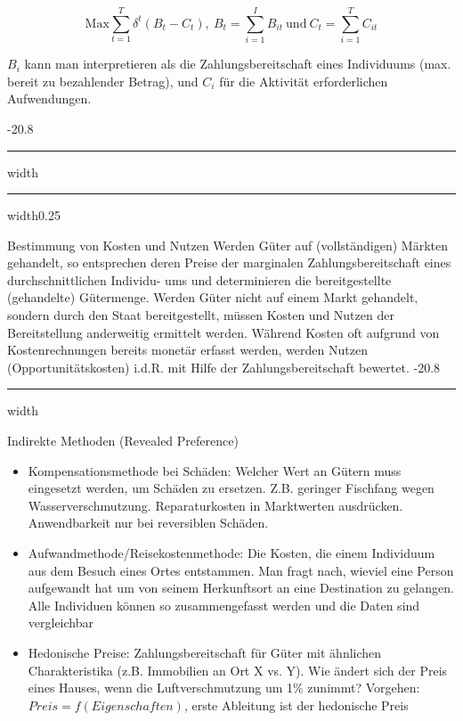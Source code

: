 \documentclass[9pt, landscape, fleqn]{scrartcl}
\makeatletter
\renewcommand{\subsection}{\@startsection{subsection}{1}{0mm}%
{-2\baselineskip}{0.8\baselineskip}%
{\hrule depth 0.2pt width\columnwidth\hrule depth0.75pt
width0.25\columnwidth\vspace*{1.2em}\large\bfseries\rmfamily}}
\renewcommand{\subsubsection}{\@startsection{subsubsection}{1}{0mm}%
{-2\baselineskip}{0.8\baselineskip}%
{\hrule depth 0.2pt width\columnwidth\vspace*{1.2em}\normalsize\bfseries\rmfamily}}
\makeatother
\begin{document}
\begin{multicols*}{3}
\begin{equation}
    \text{Max} \sum_{t=1}^T \delta^t(B_t - C_t),~ B_t = \sum_{i=1}^I B_{it}~\text{und}~ C_t = \sum_{i=1}^T C_{it}
\end{equation}

$B_i$ kann man interpretieren als die Zahlungsbereitschaft eines Individuums (max. bereit zu bezahlender Betrag), und $C_i$ für die Aktivität erforderlichen Aufwendungen.

\subsection{Bestimmung von Kosten und Nutzen}
Werden Güter auf (vollständigen) Märkten gehandelt, so entsprechen deren Preise der marginalen Zahlungsbereitschaft eines durchschnittlichen Individu- ums und determinieren die bereitgestellte (gehandelte) Gütermenge. Werden Güter nicht auf einem Markt gehandelt, sondern durch den Staat bereitgestellt, müssen Kosten und Nutzen der Bereitstellung anderweitig ermittelt werden. Während Kosten oft aufgrund von Kostenrechnungen bereits monetär erfasst werden, werden Nutzen (Opportunitätskosten) i.d.R. mit Hilfe der Zahlungsbereitschaft bewertet.
\subsubsection{Indirekte Methoden (Revealed Preference)}

\begin{itemize}
    \item Kompensationsmethode bei Schäden: Welcher Wert an Gütern muss eingesetzt werden, um Schäden zu ersetzen. Z.B. geringer Fischfang wegen Wasserverschmutzung. Reparaturkosten in Marktwerten ausdrücken. Anwendbarkeit nur bei reversiblen Schäden.
    \item Aufwandmethode/Reisekostenmethode: Die Kosten, die einem Individuum aus dem Besuch eines Ortes entstammen. Man fragt nach, wieviel eine Person aufgewandt hat um von seinem Herkunftsort an eine Destination zu gelangen. Alle Individuen können so zusammengefasst werden und die Daten sind vergleichbar 
    \item Hedonische Preise: Zahlungsbereitschaft für Güter mit ähnlichen Charakteristika (z.B. Immobilien an Ort X vs. Y). Wie ändert sich der Preis eines Hauses, wenn die Luftverschmutzung um 1\% zunimmt? Vorgehen: $Preis = f(Eigenschaften)$, erste Ableitung ist der hedonische Preis 
\end{itemize}


\end{multicols*}
\end{document}
